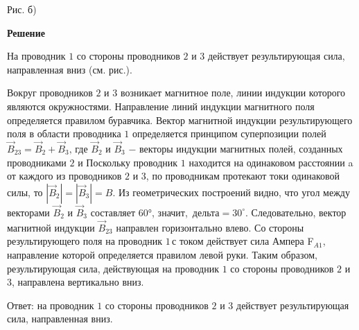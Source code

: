 \documentclass[12pt,a4paper]{article}
\begin{document}
{\begin{center}\end{center}
Рис. б)
}{
\smallskip\noindent\textbf{Решение}\par
На проводник $1$ со стороны проводников $2$ и $3$ действует результирующая сила, направленная вниз (см. рис.).
\begin{center}\end{center}
Вокруг проводников $2$ и $3$ возникает магнитное поле, линии индукции которого являются окружностями. Направление линий индукции магнитного поля определяется правилом буравчика. Вектор магнитной индукции результирующего поля в области проводника $1$ определяется принципом суперпозиции полей $\vec{B}_23=\vec{B}_2 + \vec{B}_3, \,\text{где}$ $\vec{B}_2$ и $\vec{B}_3$ − векторы индукции магнитных полей, созданных проводниками $2$ и Поскольку проводник $1$ находится на одинаковом расстоянии a от каждого из проводников $2$ и $3$, по проводникам протекают токи одинаковой силы, то $|\vec{B}_2|=|\vec{B}_3|=B.$
Из геометрических построений видно, что угол между векторами $\vec{B}_2$ и $\vec{B}_3$ составляет $60$°, значит, $\,\text{дельта} =30 ^\circ .$ Следовательно, вектор магнитной индукции $\vec{B}_23$ направлен горизонтально влево. Со стороны результирующего поля на проводник $1\,\text{с}$ током действует сила Ампера F$_{A1}$, направление которой определяется правилом левой руки. Таким образом, результирующая сила, действующая на проводник $1$ со стороны проводников $2$ и $3$, направлена вертикально вниз.

Ответ: на проводник $1$ со стороны проводников $2$ и $3$ действует результирующая сила, направленная вниз.
}
\end{document}
